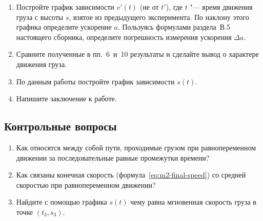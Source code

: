 \documentclass[a4paper, 12pt]{extarticle}
\begin{document}
\begin{enumerate}
\item Постройте график зависимости $v'(t)$ (не от $t'$), где $t$ "--- время движения груза с высоты $s$, взятое из предыдущего эксперимента. По наклону этого графика определите ускорение $a$. Пользуясь формулами раздела~В.5 настоящего сборника, определите погрешность измерения ускорения $\Delta a$. %
\item Сравните полученные в пп.~6~и~10 результаты и сделайте вывод о характере движения груза.
\item По данным работы постройте график зависимости $s(t)$.
\item Напишите заключение к работе.
\end{enumerate}

\subsection{Контрольные вопросы}
\begin{enumerate}
\item Как относятся между собой пути, проходимые грузом при равнопеременном движении за последовательные равные промежутки времени?
\item Как связаны конечная скорость (формула~\eqref{eq:m2-final-speed}) со средней скоростью при равнопеременном движении?
\item Найдите с помощью графика $s(t)$ чему равна мгновенная скорость груза в точке $(t_3, s_3)$. %


\end{enumerate}
\end{document}
